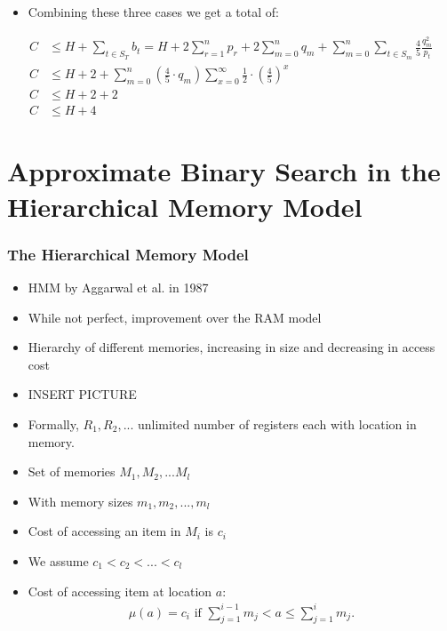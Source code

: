 \documentclass{beamer}
\theoremstyle{plain}
\begin{document}
\begin{frame}

\begin{itemize}
\item Combining these three cases we get a total of:
\end{itemize}

\begin{align*}
C &\leq H + \sum_{t \in S_T} b_t = H + 2 \sum\limits_{r = 1}^n p_r + 2 \sum\limits_{m = 0}^n q_m + \sum\limits_{m = 0}^n \sum\limits_{t \in S_m} \frac{4}{5}\frac{q_m^2}{p_t}\\
C &\leq H + 2 + \sum\limits_{m = 0}^n (\frac{4}{5} \cdot q_m) \sum\limits_{x=0}^{\infty} \frac{1}{2} \cdot (\frac{4}{5}) ^ x \\
C &\leq H + 2 + 2 \\
C &\leq H + 4
\end{align*}
\end{frame}

\section{Approximate Binary Search in the Hierarchical Memory Model}\label{Approximate Binary Search in the Hierarchical Memory Model} 
 
\begin{frame} \frametitle{The Hierarchical Memory Model}\label{The Hierarchical Memory Model}

\begin{itemize}

\item HMM by Aggarwal et al. in 1987
\item While not perfect, improvement over the RAM model
\item Hierarchy of different memories, increasing in size and decreasing in access cost
\item INSERT PICTURE

\end{itemize}
\end{frame}

\begin{frame}
\begin{itemize}
\item Formally, $R_1, R_2, ...$ unlimited number of registers each with location in memory.
\item Set of memories $M_1, M_2, ...M_l$
\item With memory sizes $m_1, m_2, ..., m_l$
\item Cost of accessing an item in $M_i$ is $c_i$
\item We assume $c_1 < c_2 < ... < c_l$
\item Cost of accessing item at location $a$:
\begin{align*}
\mu (a) = c_i \text{ if } \sum_{j = 1}^{i-1}m_j  < a \leq \sum_{j = 1}^{i}m_j.
\end{align*}
\end{itemize}
\end{frame}
\end{document}
